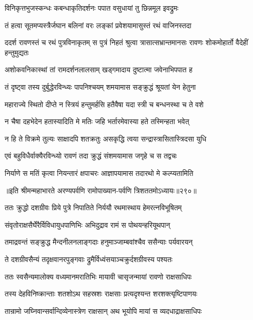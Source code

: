 \twolineshloka
{विनिकृत्तभुजस्कन्धः कबन्धाकृतिदर्शनः}
{पपात वसुधायां तु छिन्नमूल इवद्रुमः}


\twolineshloka
{तं हत्वा सूतमप्यस्त्रैर्जघान बलिनां वरः}
{लङ्कां प्रवेशयामासुस्तं रथं वाजिनस्तदा}


\threelineshloka
{ददर्श रावणस्तं च रथं पुत्रविनाकृतम्}
{स पुत्रं निहतं श्रुत्वा त्रासात्सभ्रान्तमानसः}
{रावणः शोकमोहार्तो वैदेहीं हन्तुमुद्यतः}


\twolineshloka
{अशोकवनिकास्थां तां रामदर्शनलालसाम्}
{खड्गमादाय दुष्टात्मा जवेनाभिपपात ह}


\twolineshloka
{तं दृष्ट्वा तस्य दुर्बुद्धेरविन्ध्यः पापनिश्चयम्}
{शमयामास सङ्क्रुद्धं श्रूयतां येन हेतुना}


\twolineshloka
{महाराज्ये स्थितो दीप्ते न स्त्रियं हन्तुमर्हसि}
{हतैवैषा यदा स्त्री च बन्धनस्था च ते वशे}


\twolineshloka
{न चैषा दहभेदेन हतास्यादिति मे मतिः}
{जहि भर्तारमेवास्या हते तस्मिन्हता भवेत्}


\twolineshloka
{न हि ते विक्रमे तुल्यः साक्षादपि शतक्रतुः}
{असकृद्धि त्वया सन्द्रास्त्रासितास्त्रिदसा युधि}


\twolineshloka
{एवं बहुविधैर्वाक्यैरविन्ध्यो रावणं तदा}
{क्रुद्धं संशमयामास जगृहे च स तद्वचः}


\twolineshloka
{निर्याणे स मतिं कृत्वा नियन्तारं क्षपाचरः}
{आज्ञापयामास तदारथो मे कल्प्यतामिति}


॥इति श्रीमन्महाभारते अरण्यपर्वणि रामोपाख्यान-पर्वणि त्रिशततमोऽध्यायः॥२९०॥




\twolineshloka
{ततः क्रुद्धो दशग्रीवः प्रिये पुत्रे निपातिते}
{निर्ययौ रथमास्थाय हेमरत्नविभूषितम्}


\twolineshloka
{संवृतोराक्षसैर्घेरैर्विविधायुधपाणिभिः}
{अभिदुद्राव रामं स पोथयन्हरियूथपान्}


\twolineshloka
{तमाद्रवन्तं सङ्क्रुद्ध मैन्दनीलनलाङ्गदाः}
{हनुमाञ्जाम्बवांश्चैव ससैन्याः पर्यवारयन्}


\twolineshloka
{ते दशग्रीवसैन्यं तदृक्षवानरपुङ्गवाः}
{द्रुमैर्विध्वंसयाञ्चक्रुर्दशग्रीवस्य पश्यतः}


\twolineshloka
{ततः स्वसैन्यमालोक्य वध्यमानमरातिभिः}
{मायावी चासृजन्मायां रावणो राक्षसाधिपः}


\twolineshloka
{तस्य देहविनिष्क्रान्ताः शतशोऽथ सहस्रशः}
{राक्षसाः प्रत्यदृश्यन्त शरशक्त्यृष्टिपाणयः}


\twolineshloka
{तान्रामो जघ्निवान्सर्वान्दिव्येनास्त्रेण राक्षसान्}
{अथ भूयोपि मायां स व्यदधाद्राक्षसाधिपः}


